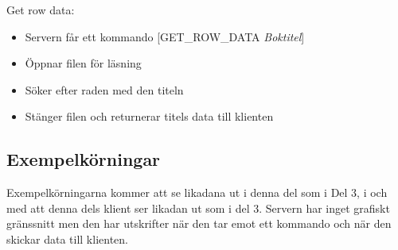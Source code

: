 \documentclass[11pt, titlepage, oneside, a4paper]{article}
\newcommand{\Subsection}[1]{\vspace{-4pt}\subsection{#1}\vspace{-8pt}}
\begin{document}
		Get row data:
		\begin{itemize}
		 \item Servern får ett kommando [GET\_ROW\_DATA \emph{Boktitel}]
		 \item Öppnar filen för läsning
		 \item Söker efter raden med den titeln
		 \item Stänger filen och returnerar titels data till klienten
		\end{itemize}

		\Subsection{Exempelkörningar}
		Exempelkörningarna kommer att se likadana ut i denna del som i Del 3, i och med att denna dels klient ser likadan ut som
		i del 3. Servern har inget grafiskt gränssnitt men den har utskrifter när den tar emot ett kommando och när den skickar 
		data till klienten.
		
\end{document}
